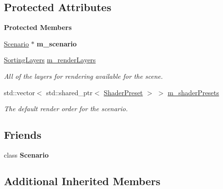\subsection*{Protected Attributes}
\begin{Indent}\textbf{ Protected Members}\par
\begin{DoxyCompactItemize}
\item 
\mbox{\label{classrev_1_1_scenario_settings_a273db85fc0a569bf201c87f54397d5c5}} 
\mbox{\hyperlink{classrev_1_1_scenario}{Scenario}} $\ast$ {\bfseries m\+\_\+scenario}
\item 
\mbox{\label{classrev_1_1_scenario_settings_a508ea3ec4eaf25b55e8558d9c73840b1}} 
\mbox{\hyperlink{structrev_1_1_sorting_layers}{Sorting\+Layers}} \mbox{\hyperlink{classrev_1_1_scenario_settings_a508ea3ec4eaf25b55e8558d9c73840b1}{m\+\_\+render\+Layers}}
\begin{DoxyCompactList}\small\item\em All of the layers for rendering available for the scene. \end{DoxyCompactList}\item 
std\+::vector$<$ std\+::shared\+\_\+ptr$<$ \mbox{\hyperlink{classrev_1_1_shader_preset}{Shader\+Preset}} $>$ $>$ \mbox{\hyperlink{classrev_1_1_scenario_settings_a19886b9bd70d7a9fa470b90ef2d53ada}{m\+\_\+shader\+Presets}}
\begin{DoxyCompactList}\small\item\em The default render order for the scenario. \end{DoxyCompactList}\end{DoxyCompactItemize}
\end{Indent}
\subsection*{Friends}
\begin{DoxyCompactItemize}
\item 
\mbox{\label{classrev_1_1_scenario_settings_a8aa97ba078be6635ba5a8b6c7a3b66a4}} 
class {\bfseries Scenario}
\end{DoxyCompactItemize}
\subsection*{Additional Inherited Members}


